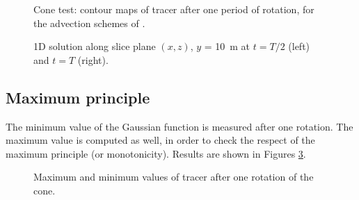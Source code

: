 \begin{figure}[H]
\begin{minipage}[t]{0.50\textwidth}
 \centering
\end{minipage}%
\begin{minipage}[t]{0.50\textwidth}
 \centering
\end{minipage}
\begin{minipage}[t]{0.50\textwidth}
 \centering
\end{minipage}%
\begin{minipage}[t]{0.50\textwidth}
 \centering
\end{minipage}
 \caption{Cone test: contour maps of tracer after one period of rotation, for the advection schemes of .}
 \label{t2d:cone:profiles2}
\end{figure}

\begin{figure}[H]
\begin{minipage}[t]{0.50\textwidth}
 \centering
\end{minipage}%
\begin{minipage}[t]{0.50\textwidth}
 \centering
\end{minipage}%
\caption{1D solution along slice plane $(x,z)$, $y$ = 10~m at $t = T/2$ (left) and $t = T$ (right).}
\label{t2d:cone:1dslice}
\end{figure}

\newpage

\subsection{Maximum principle}

The minimum value of the Gaussian function is measured after one rotation.
The maximum value is computed as well, in order to check the respect of the
maximum principle (or monotonicity).
Results are shown in Figures \ref{t2d:cone:minmax}.

\begin{figure}[H]
\centering
{}
\caption{Maximum and minimum values of tracer after one rotation of the cone.}
\label{t2d:cone:minmax}
\end{figure}

